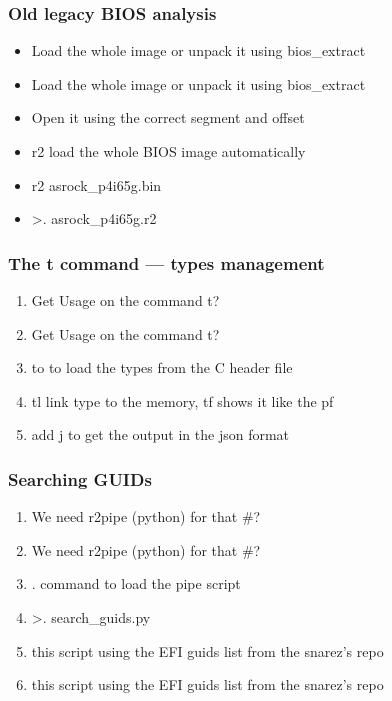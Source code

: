 \documentclass[10pt,pdf,utf8,english,compress,hyperref={unicode}]{beamer}
\begin{document}
\begin{frame}[fragile]
  \frametitle{Old legacy BIOS analysis}
  \begin{itemize}
\ifxetex
	\item Load the whole image or unpack it using bios\_extract
\else
    \item Load the whole image or unpack it using bios\_extract 
\fi
	\item Open it using the correct segment and offset
	\item r2 load the whole BIOS image automatically
	\item r2 asrock\_p4i65g.bin
	\item \textgreater. asrock\_p4i65g.r2
  \end{itemize}
\end{frame}

\begin{frame}[fragile]
  \frametitle{The t command — types management}
  \begin{enumerate}
\ifxetex
  \item Get Usage on the command \alert{t?}
\else
  \item Get Usage on the command \alert{t?} 
\fi
  \item \alert{to} to load the types from the C header file
  \item \alert{tl} link type to the memory, \alert{tf} shows it like the pf
  \item add \alert{j} to get the output in the json format
 \end{enumerate}
\end{frame}

\begin{frame}[fragile]
  \frametitle{Searching GUIDs}
  \begin{enumerate}
\ifxetex
  \item We need r2pipe (python) for that \alert{\#?}
\else
  \item We need r2pipe (python) for that \alert{\#?} 
\fi
  \item \alert{.} command to load the pipe script
  \item \textgreater. search\_guids.py
\ifxetex
  \item this script using the EFI guids list from the snarez's repo
\else
  \item this script using the EFI guids list from the snarez's repo 
\fi
 \end{enumerate}
\end{frame}
\end{document}
